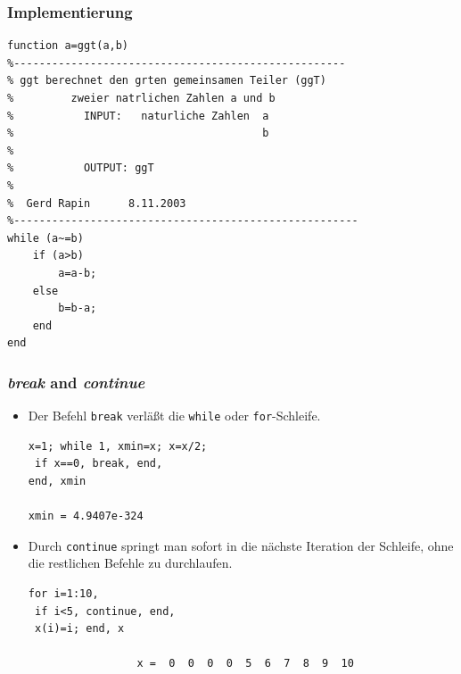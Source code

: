 \begin{frame}[fragile]\frametitle{Implementierung}
\begin{lstlisting}
function a=ggt(a,b)
%----------------------------------------------------
% ggt berechnet den grten gemeinsamen Teiler (ggT)    
%         zweier natrlichen Zahlen a und b
%           INPUT:   naturliche Zahlen  a
%                                       b
%                 
%           OUTPUT: ggT
%                   
%  Gerd Rapin      8.11.2003
%------------------------------------------------------
while (a~=b)
    if (a>b)
        a=a-b;
    else
        b=b-a;
    end
end
\end{lstlisting}
\end{frame}
%
%
%
\begin{frame}[fragile]\frametitle{{\it break} and {\it continue}}
\begin{itemize}
\item  Der Befehl \lstinline!break! verläßt die \lstinline!while! oder
  \lstinline!for!-Schleife.
\begin{lstlisting}
x=1; while 1, xmin=x; x=x/2;
 if x==0, break, end,
end, xmin

xmin = 4.9407e-324
\end{lstlisting} 
\vspace*{-0.5cm}
\item  Durch \lstinline!continue! springt man sofort in die
  nächste Iteration der Schleife, ohne die restlichen Befehle zu
  durchlaufen.
\vspace*{-0.5cm}\\
\begin{lstlisting}
for i=1:10,
 if i<5, continue, end,
 x(i)=i; end, x

                 x =  0  0  0  0  5  6  7  8  9  10
\end{lstlisting}
\end{itemize}
\end{frame}

